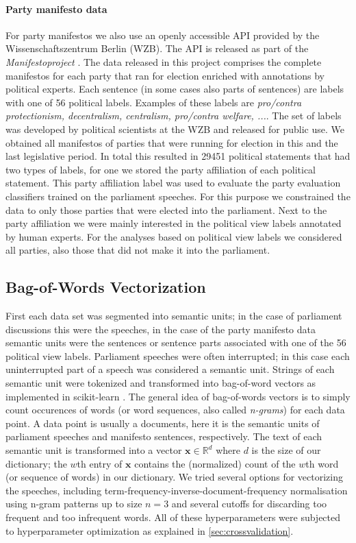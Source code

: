 \documentclass[runningheads,a4paper]{llncs}
\renewcommand{\vec}[1]{\mathbf{#1}}
\begin{document}
\paragraph{Party manifesto data}
For party manifestos we also use an openly accessible API provided by the Wissenschaftszentrum Berlin (WZB). The API is released as part of the {\em Manifestoproject} \cite{manifesto}. The data released in this project comprises the complete manifestos for each party that ran for election enriched with annotations by political experts. Each sentence (in some cases also parts of sentences) are labels with one of 56 political labels. Examples of these labels are {\em pro/contra protectionism, decentralism, centralism, pro/contra welfare, ...}. The set of labels was developed by political scientists at the WZB and released for public use. We obtained all manifestos of parties that were running for election in this and the last legislative period. In total this resulted in 29451 political statements that had two types of labels, for one we stored the party affiliation of each political statement. This party affiliation label was used to evaluate the party evaluation classifiers trained on the parliament speeches. For this purpose we constrained the data to only those parties that were elected into the parliament. Next to the party affiliation we were mainly interested in the political view labels annotated by human experts. For the analyses based on political view labels we considered all parties, also those that did not make it into the parliament. 

\subsection{Bag-of-Words Vectorization}\label{sec:bow-vectorization}
First each data set was segmented into semantic units; in the case of parliament discussions this were the speeches, in the case of the party manifesto data semantic units were the sentences or sentence parts associated with one of the 56 political view labels.  Parliament speeches were often interrupted; in this case each uninterrupted part of a speech was considered a semantic unit. Strings of each semantic unit were tokenized and transformed into bag-of-word vectors as implemented in scikit-learn \cite{scikit-learn}. The general idea of bag-of-words vectors is to simply count occurences of words (or word sequences, also called {\em n-grams}) for each data point. A data point is usually a documents, here it is the semantic units of parliament speeches and manifesto sentences, respectively. The text of each semantic unit is transformed into a vector $\vec{x}\in\mathds{R}^d$ where $d$ is the size of our dictionary; the $w$th entry of $\vec{x}$ contains the (normalized) count of the $w$th word (or sequence of words) in our dictionary. We tried several options for vectorizing the speeches, including term-frequency-inverse-document-frequency normalisation using n-gram patterns up to size $n=3$ and several cutoffs for discarding too frequent and too infrequent words. All of these hyperparameters were subjected to hyperparameter optimization as explained in \autoref{sec:crossvalidation}. 
\end{document}
